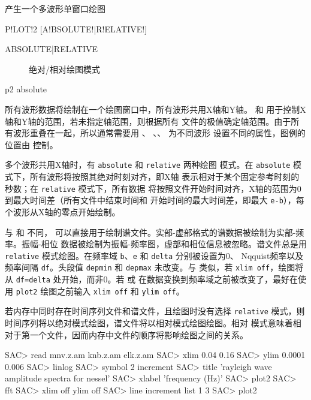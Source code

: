 \label{cmd:plot2}

产生一个多波形单窗口绘图

\begin{SACSTX}
P!LOT!2 [A!BSOLUTE!|R!ELATIVE!]
\end{SACSTX}

\begin{description}
\item [ABSOLUTE|RELATIVE] 绝对/相对绘图模式
\end{description}

\begin{SACDFT}
p2 absolute
\end{SACDFT}

所有波形数据将绘制在一个绘图窗口中，所有波形共用X轴和Y轴。
和  用于控制X轴和Y轴的范围，若未指定轴范围，则根据所有
文件的极值确定轴范围。由于所有波形重叠在一起，所以通常需要用 、
、、 为不同波形
设置不同的属性，图例的位置由  控制。

多个波形共用X轴时，有 \texttt{absolute} 和 \texttt{relative} 两种绘图
模式。在 \texttt{absolute} 模式下，所有波形将按照其绝对时刻对齐，即X轴
表示相对于某个固定参考时刻的秒数；在 \texttt{relative} 模式下，所有数据
将按照文件开始时间对齐，X轴的范围为0到最大时间差（所有文件中结束时间和
开始时间的最大时间差，即最大 \texttt{e-b}），每个波形从X轴的零点开始绘制。

与  和  不同，
可以直接用于绘制谱文件。实部-虚部格式的谱数据被绘制为实部-频率。振幅-相位
数据被绘制为振幅-频率图，虚部和相位信息被忽略。谱文件总是用 \texttt{relative}
模式绘图。在频率域 \texttt{b}、\texttt{e} 和 \texttt{delta} 分别被设置为0、
Nqquist频率以及频率间隔 \texttt{df}。头段值 \texttt{depmin} 和 \texttt{depmax}
未改变。与  类似，若 \texttt{xlim off}，绘图将从
\texttt{df=delta} 处开始，而非0。若  或 
在数据变换到频率域之前被改变了，最好在使用 \texttt{plot2} 绘图之前输入
\texttt{xlim off} 和 \texttt{ylim off}。

若内存中同时存在时间序列文件和谱文件，且绘图时没有选择 \texttt{relative}
模式，则时间序列将以绝对模式绘图，谱文件将以相对模式绘图绘图。相对
模式意味着相对于第一个文件，因而内存中文件的顺序将影响绘图之间的关系。

\begin{SACCode}
SAC> read mnv.z.am knb.z.am elk.z.am
SAC> xlim 0.04 0.16
SAC> ylim 0.0001 0.006
SAC> linlog
SAC> symbol 2 increment
SAC> title 'rayleigh wave amplitude spectra for nessel'
SAC> xlabel 'frequency (Hz)'
SAC> plot2
SAC> fft
SAC> xlim off ylim off
SAC> line increment list 1 3
SAC> plot2
\end{SACCode}
